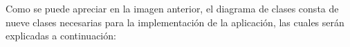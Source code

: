 \documentclass{memoria}
\begin{document}



Como se puede apreciar en la imagen anterior, el diagrama de clases consta de nueve clases necesarias para la implementación de la aplicación, las cuales serán explicadas a continuación:
\end{document}
